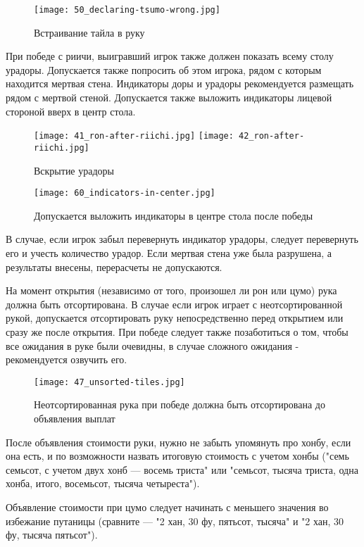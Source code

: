 \begin{figure}[H]
	\centering
	\texttt{[image: 50\_declaring-tsumo-wrong.jpg]}
	\caption{Встраивание тайла в руку}
\end{figure}

При победе с риичи, выигравший игрок также должен показать всему столу урадоры. Допускается также попросить об этом игрока, рядом с которым находится мертвая стена. Индикаторы доры и урадоры рекомендуется размещать рядом с мертвой стеной. Допускается также выложить индикаторы лицевой стороной вверх в центр стола.

\begin{figure}[H]
	\centering
	\texttt{[image: 41\_ron-after-riichi.jpg]}
	\texttt{[image: 42\_ron-after-riichi.jpg]}
	\caption{Вскрытие урадоры}
\end{figure}

\begin{figure}[H]
	\centering
	\texttt{[image: 60\_indicators-in-center.jpg]}
	\caption{Допускается выложить индикаторы в центре стола после победы}
\end{figure}

В случае, если игрок забыл перевернуть индикатор урадоры, следует перевернуть его и учесть количество урадор. Если мертвая стена уже была разрушена, а результаты внесены, перерасчеты не допускаются.

На момент открытия (независимо от того, произошел ли рон или цумо) рука должна быть отсортирована. В случае если игрок играет с неотсортированной рукой, допускается отсортировать руку непосредственно перед открытием или сразу же после открытия. При победе следует также позаботиться о том, чтобы все ожидания в руке были очевидны, в случае сложного ожидания - рекомендуется озвучить его.

\begin{figure}[H]
	\centering
	\texttt{[image: 47\_unsorted-tiles.jpg]}
	\caption{\centering Неотсортированная рука при победе \linebreak должна быть отсортирована до объявления выплат}
\end{figure}

После объявления стоимости руки, нужно не забыть упомянуть про хонбу, если она есть, и по возможности назвать итоговую стоимость с учетом хонбы ("семь семьсот, с учетом двух хонб --- восемь триста" или "семьсот, тысяча триста, одна хонба, итого, восемьсот, тысяча четыреста").

Объявление стоимости при цумо следует начинать с меньшего значения во избежание путаницы (сравните --- "2 хан, 30 фу, пятьсот, тысяча" и "2 хан, 30 фу, тысяча пятьсот").

